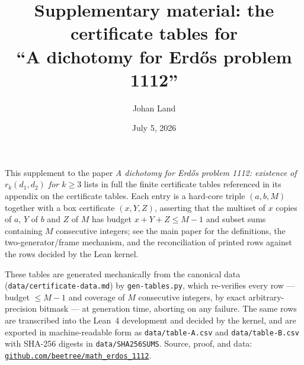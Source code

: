 \documentclass[11pt]{amsart}
\title{Supplementary material: the certificate tables for\\
       ``A dichotomy for Erd\H{o}s problem 1112''}
\author{Johan Land}
\date{July 5, 2026}
\newcommand{\repo}{\href{https://github.com/beetree/math_erdos_1112}{\texttt{github.com/beetree/math\_erdos\_1112}}}
\begin{document}
\maketitle

This supplement to the paper \emph{A dichotomy for Erd\H{o}s problem 1112: existence of
$r_k(d_1,d_2)$ for $k \ge 3$} lists in full the finite certificate tables referenced in its
appendix on the certificate tables. Each entry is a hard-core triple $(a,b,M)$ together with a
box certificate $(x,Y,Z)$, asserting that the multiset of $x$ copies of $a$, $Y$ of $b$ and $Z$ of
$M$ has budget $x + Y + Z \le M-1$ and subset sums containing $M$ consecutive integers; see the main
paper for the definitions, the two-generator/frame mechanism, and the reconciliation of printed rows
against the rows decided by the Lean kernel.

These tables are generated mechanically from the canonical data (\texttt{data/certificate-data.md})
by \texttt{gen-tables.py}, which re-verifies every row --- budget $\le M-1$ and coverage of $M$
consecutive integers, by exact arbitrary-precision bitmask --- at generation time, aborting on any
failure. The same rows are transcribed into the Lean~4 development and decided by the kernel, and are
exported in machine-readable form as \texttt{data/table-A.csv} and \texttt{data/table-B.csv} with
SHA-256 digests in \texttt{data/SHA256SUMS}. Source, proof, and data: \repo.

\renewcommand{\thetable}{A}


\renewcommand{\thetable}{B}

\end{document}

